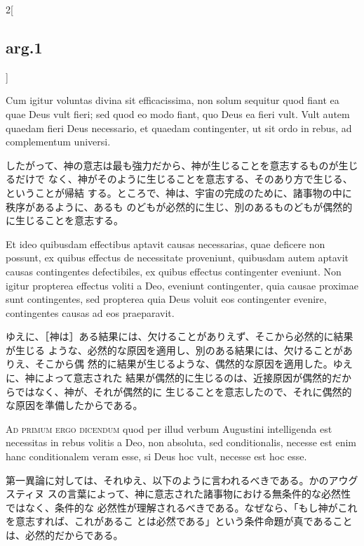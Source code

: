 \documentclass[paper=a4paper,fontsize=10pt,jafontsize=9pt,titlepage]{jlreq}
\begin{document}
\begin{paracol}{2}[\subsection{arg.1}]
\switchcolumn*


Cum igitur voluntas divina sit efficacissima, non solum sequitur quod fiant ea
quae Deus vult fieri; sed quod eo modo fiant, quo Deus ea fieri vult. Vult autem
quaedam fieri Deus necessario, et quaedam contingenter, ut sit ordo in rebus, ad
complementum universi.

\switchcolumn

したがって、神の意志は最も強力だから、神が生じることを意志するものが生じるだけで
 なく、神がそのように生じることを意志する、そのあり方で生じる、ということが帰結
 する。ところで、神は、宇宙の完成のために、諸事物の中に秩序があるように、あるも
 のどもが必然的に生じ、別のあるものどもが偶然的に生じることを意志する。

\switchcolumn*


Et ideo quibusdam effectibus aptavit causas necessarias, quae deficere non
possunt, ex quibus effectus de necessitate proveniunt, quibusdam autem aptavit
causas contingentes defectibiles, ex quibus effectus contingenter eveniunt. Non
igitur propterea effectus voliti a Deo, eveniunt contingenter, quia causae
proximae sunt contingentes, sed propterea quia Deus voluit eos contingenter
evenire, contingentes causas ad eos praeparavit.

\switchcolumn

ゆえに、［神は］ある結果には、欠けることがありえず、そこから必然的に結果が生じる
 ような、必然的な原因を適用し、別のある結果には、欠けることがありえ、そこから偶
 然的に結果が生じるような、偶然的な原因を適用した。ゆえに、神によって意志された
 結果が偶然的に生じるのは、近接原因が偶然的だからではなく、神が、それが偶然的に
 生じることを意志したので、それに偶然的な原因を準備したからである。

\switchcolumn*[\subsection{ad.1}]


{\scshape Ad primum ergo dicendum} quod per illud verbum
Augustini intelligenda est necessitas in rebus volitis a Deo, non
absoluta, sed conditionalis, necesse est enim hanc conditionalem veram
esse, si Deus hoc vult, necesse est hoc esse.

\switchcolumn

第一異論に対しては、それゆえ、以下のように言われるべきである。かのアウグスティヌ
スの言葉によって、神に意志された諸事物における無条件的な必然性ではなく、条件的な
必然性が理解されるべきである。なぜなら、「もし神がこれを意志すれば、これがあるこ
とは必然である」という条件命題が真であることは、必然的だからである。


\end{paracol}
\end{document}
